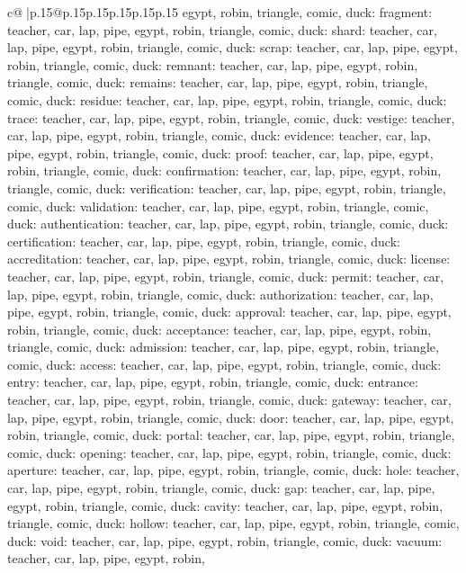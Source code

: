 \documentclass{article}
\begin{document}
{\begin{supertabular}{c@{$\;$}|p{.15\linewidth}@{}p{.15\linewidth}p{.15\linewidth}p{.15\linewidth}p{.15\linewidth}p{.15\linewidth}}
{{{egypt, robin, triangle, comic, duck\n\nCLUE: fragment\nTARGETS: teacher, car, lap, pipe, egypt, robin, triangle, comic, duck\n\nCLUE: shard\nTARGETS: teacher, car, lap, pipe, egypt, robin, triangle, comic, duck\n\nCLUE: scrap\nTARGETS: teacher, car, lap, pipe, egypt, robin, triangle, comic, duck\n\nCLUE: remnant\nTARGETS: teacher, car, lap, pipe, egypt, robin, triangle, comic, duck\n\nCLUE: remains\nTARGETS: teacher, car, lap, pipe, egypt, robin, triangle, comic, duck\n\nCLUE: residue\nTARGETS: teacher, car, lap, pipe, egypt, robin, triangle, comic, duck\n\nCLUE: trace\nTARGETS: teacher, car, lap, pipe, egypt, robin, triangle, comic, duck\n\nCLUE: vestige\nTARGETS: teacher, car, lap, pipe, egypt, robin, triangle, comic, duck\n\nCLUE: evidence\nTARGETS: teacher, car, lap, pipe, egypt, robin, triangle, comic, duck\n\nCLUE: proof\nTARGETS: teacher, car, lap, pipe, egypt, robin, triangle, comic, duck\n\nCLUE: confirmation\nTARGETS: teacher, car, lap, pipe, egypt, robin, triangle, comic, duck\n\nCLUE: verification\nTARGETS: teacher, car, lap, pipe, egypt, robin, triangle, comic, duck\n\nCLUE: validation\nTARGETS: teacher, car, lap, pipe, egypt, robin, triangle, comic, duck\n\nCLUE: authentication\nTARGETS: teacher, car, lap, pipe, egypt, robin, triangle, comic, duck\n\nCLUE: certification\nTARGETS: teacher, car, lap, pipe, egypt, robin, triangle, comic, duck\n\nCLUE: accreditation\nTARGETS: teacher, car, lap, pipe, egypt, robin, triangle, comic, duck\n\nCLUE: license\nTARGETS: teacher, car, lap, pipe, egypt, robin, triangle, comic, duck\n\nCLUE: permit\nTARGETS: teacher, car, lap, pipe, egypt, robin, triangle, comic, duck\n\nCLUE: authorization\nTARGETS: teacher, car, lap, pipe, egypt, robin, triangle, comic, duck\n\nCLUE: approval\nTARGETS: teacher, car, lap, pipe, egypt, robin, triangle, comic, duck\n\nCLUE: acceptance\nTARGETS: teacher, car, lap, pipe, egypt, robin, triangle, comic, duck\n\nCLUE: admission\nTARGETS: teacher, car, lap, pipe, egypt, robin, triangle, comic, duck\n\nCLUE: access\nTARGETS: teacher, car, lap, pipe, egypt, robin, triangle, comic, duck\n\nCLUE: entry\nTARGETS: teacher, car, lap, pipe, egypt, robin, triangle, comic, duck\n\nCLUE: entrance\nTARGETS: teacher, car, lap, pipe, egypt, robin, triangle, comic, duck\n\nCLUE: gateway\nTARGETS: teacher, car, lap, pipe, egypt, robin, triangle, comic, duck\n\nCLUE: door\nTARGETS: teacher, car, lap, pipe, egypt, robin, triangle, comic, duck\n\nCLUE: portal\nTARGETS: teacher, car, lap, pipe, egypt, robin, triangle, comic, duck\n\nCLUE: opening\nTARGETS: teacher, car, lap, pipe, egypt, robin, triangle, comic, duck\n\nCLUE: aperture\nTARGETS: teacher, car, lap, pipe, egypt, robin, triangle, comic, duck\n\nCLUE: hole\nTARGETS: teacher, car, lap, pipe, egypt, robin, triangle, comic, duck\n\nCLUE: gap\nTARGETS: teacher, car, lap, pipe, egypt, robin, triangle, comic, duck\n\nCLUE: cavity\nTARGETS: teacher, car, lap, pipe, egypt, robin, triangle, comic, duck\n\nCLUE: hollow\nTARGETS: teacher, car, lap, pipe, egypt, robin, triangle, comic, duck\n\nCLUE: void\nTARGETS: teacher, car, lap, pipe, egypt, robin, triangle, comic, duck\n\nCLUE: vacuum\nTARGETS: teacher, car, lap, pipe, egypt, robin, }}}
\end{supertabular}}
\end{document}
